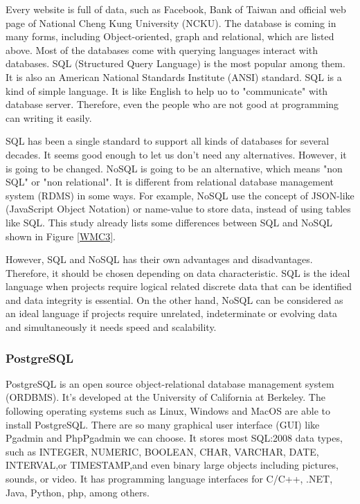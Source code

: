 Every website is full of data, such as Facebook, Bank of Taiwan and official web page of National Cheng Kung University (NCKU).
The database is coming in many forms, including Object-oriented, graph and relational, which are listed above.
Most of the databases come with querying languages interact with databases.
SQL (Structured Query Language) is the most popular among them.
It is also an American National Standards Institute (ANSI) standard.
SQL is a kind of simple language.
It is like English to help uo to "communicate" with database server.
Therefore, even the people who are not good at programming can writing it easily.

SQL has been a single standard to support all kinds of databases for several decades.
It seems good enough to let us don't need any alternatives.
However, it is going to be changed.
NoSQL is going to be an alternative, which means "non SQL" or "non relational".
It is different from relational database management system (RDMS) in some ways.
For example, NoSQL use the concept of JSON-like (JavaScript Object Notation) or name-value to store data, instead of using tables like SQL.
This study already lists some differences between SQL and NoSQL shown in Figure \ref{WMC3}.

However, SQL and NoSQL has their own advantages and disadvantages.
Therefore, it should be chosen depending on data characteristic.
SQL is the ideal language when projects require logical related discrete data that can be identified and data integrity is essential.
On the other hand, NoSQL can be considered as an ideal language if projects require unrelated, indeterminate or evolving data and simultaneously it needs speed and scalability.

\subsubsection{PostgreSQL}

PostgreSQL is an open source object-relational database management system (ORDBMS).
It's developed at the University of California at Berkeley.
The following operating systems such as Linux, Windows and MacOS are able to install PostgreSQL.
There are so many graphical user interface (GUI) like Pgadmin and PhpPgadmin we can choose.
It stores most SQL:2008 data types, such as INTEGER, NUMERIC, BOOLEAN, CHAR, VARCHAR, DATE, INTERVAL,or TIMESTAMP,and even binary large objects including pictures, sounds, or video.
It has programming language interfaces for C/C++, .NET, Java, Python, php, among others.

